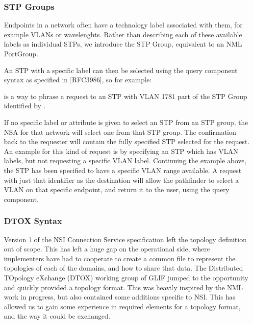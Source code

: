 \documentclass{article}
\begin{document}
\subsubsection{STP Groups}

 Endpoints in a network often have a technology label associated 
with them, for example VLANs or wavelenghts. Rather than describing each of these 
available labels as individual STPs, we introduce the STP Group, equivalent to 
an NML PortGroup.

 An STP with a specific label can then be selected using the query 
component syntax as specified in [RFC3986], so for example:

 is a way to phrase 
a request to an STP with VLAN 1781 part of the STP Group identified by .


 If no specific label or attribute is given to select an STP from 
an STP group, the NSA for that network will select one from that STP group. The 
confirmation back to the requester will contain the fully specified STP selected 
for the request. An example for this kind of request is by specifying an STP which 
has VLAN labels, but not requesting a specific VLAN label. Continuing the example 
above, the STP  has been specified to have a 
specific VLAN range available. A request with just that identifier as the destination 
will allow the pathfinder to select a VLAN on that specific endpoint, and return 
it to the user, using the query component.\label{h.p5scbjtwxk7s}


\subsubsection{DTOX Syntax}

 Version 1 of the NSI Connection Service specification left the 
topology definition out of scope. This has left a huge gap on the operational side, 
where implementers have had to cooperate to create a common file to represent the 
topologies of each of the domains, and how to share that data. The Distributed 
TOpology eXchange (DTOX) working group of GLIF jumped to the opportunity and quickly 
provided a topology format. This was heavily inspired by the NML work in progress, 
but also contained some additions specific to NSI. This has allowed us to gain 
some experience in required elements for a topology format, and the way it could 
be exchanged.\
\end{document}
